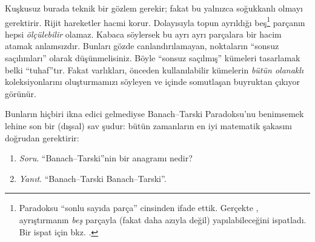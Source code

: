 \documentclass[../../../include/open-logic-section]{subfiles}
\begin{document}
Kuşkusuz burada teknik bir gözlem gerekir; fakat bu yalnızca soğukkanlı
olmayı gerektirir. Rijit hareketler hacmi korur. Dolayısıyla topun ayrıldığı
beş\footnote{Paradoksu ``sonlu sayıda parça'' cinsinden ifade ettik.
Gerçekte \citet{Robinson1947}, ayrıştırmanın \emph{beş} parçayla (fakat
daha azıyla değil) yapılabileceğini ispatladı. Bir ispat için bkz.
\citet[pp.~66--7]{Wagon2016}.} parçanın hepsi \emph{ölçülebilir} olamaz.
Kabaca söylersek bu ayrı ayrı parçalara bir hacim atamak anlamsızdır.
Bunları gözde canlandırılamayan, noktaların ``sonsuz saçılımları'' olarak
düşünmelisiniz. Böyle ``sonsuz saçılmış'' kümeleri tasarlamak belki
``tuhaf''tır. Fakat varlıkları, önceden kullanılabilir kümelerin
\emph{bütün olanaklı} koleksiyonlarını oluşturmamızı söyleyen ve
\stagesacc{} içinde somutlaşan buyruktan çıkıyor görünür.

Bunların hiçbiri ikna edici gelmediyse Banach--Tarski Paradoksu'nu
benimsemek lehine son bir (dışsal) sav şudur: bütün zamanların en iyi
matematik şakasını doğrudan gerektirir:
\begin{enumerate}
	\item[] \emph{Soru}. ``Banach--Tarski''nin bir anagramı nedir?
	\item[] \emph{Yanıt}. ``Banach--Tarski Banach--Tarski''.
\end{enumerate}
\end{document}
